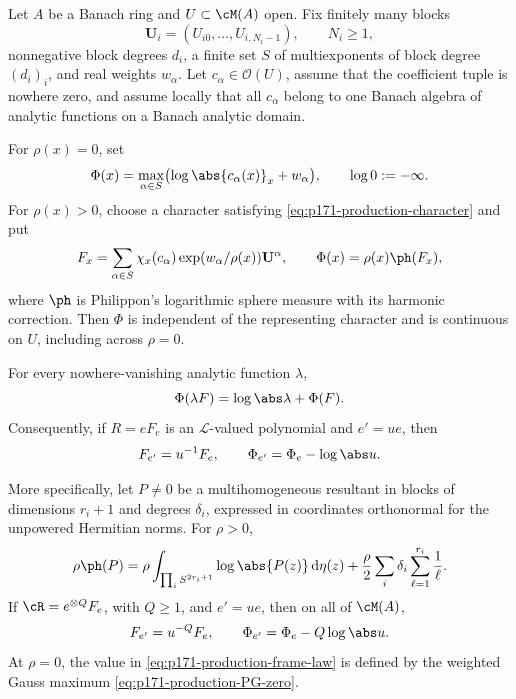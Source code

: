 \begin{theorem}
\label{thm:p171-production-weighted-PG}
Let \(A\) be a Banach ring and \(U\subset\cM(A)\) open.  Fix finitely many
blocks
\[
 \mathbf U_i=(U_{i0},\ldots,U_{i,N_i-1}),\qquad N_i\geq1,
\]
nonnegative block degrees \(d_i\), a finite set \(S\) of multiexponents of
block degree \((d_i)_i\), and real weights \(w_\alpha\).  Let
\(c_\alpha\in\mathcal O(U)\), assume that the coefficient tuple is nowhere
zero, and assume locally that all \(c_\alpha\) belong to one Banach algebra
of analytic functions on a Banach analytic domain.

For \(\rho(x)=0\), set
\begin{equation}
 \Phi(x)=
 \max_{\alpha\in S}
 \bigl(\log\abs{c_\alpha(x)}_x+w_\alpha\bigr),
 \qquad \log0:=-\infty.
 \label{eq:p171-production-PG-zero}
\end{equation}
For \(\rho(x)>0\), choose a character satisfying
\eqref{eq:p171-production-character} and put
\begin{equation}
 F_x=
 \sum_{\alpha\in S}
 \chi_x(c_\alpha)\exp(w_\alpha/\rho(x))\mathbf U^\alpha,
 \qquad
 \Phi(x)=\rho(x)\ph(F_x),
 \label{eq:p171-production-PG-positive}
\end{equation}
where \(\ph\) is Philippon's logarithmic sphere measure with its harmonic
correction.  Then \(\Phi\) is independent of the representing character
and is continuous on \(U\), including across \(\rho=0\).

For every nowhere-vanishing analytic function \(\lambda\),
\begin{equation}
 \Phi(\lambda F)=\log\abs\lambda+\Phi(F).
 \label{eq:p171-production-PG-homogeneity}
\end{equation}
Consequently, if \(R=eF_e\) is an \(\mathcal L\)-valued polynomial and
\(e'=ue\), then
\begin{equation}
 F_{e'}=u^{-1}F_e,
 \qquad
 \Phi_{e'}=\Phi_e-\log\abs u.
 \label{eq:p171-production-PG-frame}
\end{equation}

More specifically, let \(P\neq0\) be a multihomogeneous resultant in
blocks of dimensions \(r_i+1\) and degrees \(\delta_i\), expressed in
coordinates orthonormal for the unpowered Hermitian norms.  For
\(\rho>0\),
\begin{equation}
 \rho\ph(P)
 =
 \rho\int_{\prod_iS^{2r_i+1}}\log\abs{P(z)}\,\mathrm d\eta(z)
 +
 \frac{\rho}{2}
 \sum_i\delta_i\sum_{\ell=1}^{r_i}\frac1\ell.
 \label{eq:p171-production-powered-PH}
\end{equation}
If \(\cR=e^{\otimes Q}F_e\), with \(Q\geq1\), and \(e'=ue\), then on all
of \(\cM(A)\),
\begin{equation}
 F_{e'}=u^{-Q}F_e,
 \qquad
 \Phi_{e'}=\Phi_e-Q\log\abs u.
 \label{eq:p171-production-frame-law}
\end{equation}
At \(\rho=0\), the value in
\eqref{eq:p171-production-frame-law} is defined by the weighted Gauss
maximum \eqref{eq:p171-production-PG-zero}.
\end{theorem}

